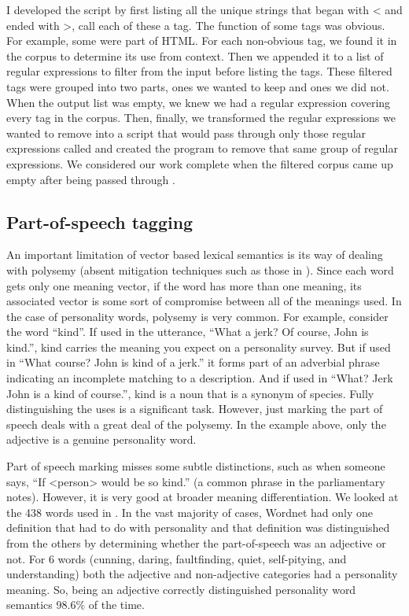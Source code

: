 \documentclass[eric_thesis.tex]{subfiles}
\begin{document}
I developed the script by first listing all the unique strings that began with 
< and ended with >, call each of these a tag. The function of some tags was 
obvious. For example, some were part of HTML. For each non-obvious tag, we found 
it in the corpus to determine its use from context. Then we appended it to a 
list of regular expressions to filter from the input before listing the tags. 
These filtered tags were grouped into two parts, ones we wanted to keep and ones 
we did not. When the output list was empty, we knew we had a regular expression 
covering every tag in the corpus. Then, finally, we transformed the regular 
expressions we wanted to remove into a script that would pass through only those 
regular expressions called  and created the 
 program to remove that same group of regular 
expressions. We considered our work complete when the filtered corpus came up 
empty after being passed through .

\subsection{Part-of-speech tagging}

An important limitation of vector based lexical semantics is its way of dealing 
with polysemy (absent mitigation techniques such as those in ). Since each word gets only one meaning vector, if the 
word has more than one meaning, its associated vector is some sort of compromise 
between all of the meanings used. In the case of personality words, polysemy is 
very common. For example, consider the word ``kind''. If used in the utterance, 
``What a jerk? Of course, John is kind.'', kind carries the meaning you expect 
on a personality survey. But if used in ``What course? John is kind of a jerk.'' 
it forms part of an adverbial phrase indicating an incomplete matching to a 
description. And if used in ``What? Jerk John is a kind of course.'', kind is a 
noun that is a synonym of species. Fully distinguishing the uses is a 
significant task. However, just marking the part of speech deals with a great 
deal of the polysemy. In the example above, only the adjective is a genuine 
personality word. 

Part of speech marking misses some subtle distinctions, such as when someone 
says, ``If <person> would be so kind.'' (a common phrase in the parliamentary 
notes). However, it is very good at broader meaning differentiation. We looked 
at the 438 words used in . In 
the vast majority of cases, Wordnet had only one definition that had to do with 
personality and that definition was distinguished from the others by determining 
whether the part-of-speech was an adjective or not. For 6 words (cunning, 
daring, faultfinding, quiet, self-pitying, and understanding) both the adjective 
and non-adjective categories had a personality meaning. So, being an adjective 
correctly distinguished personality word semantics 98.6\% of the time.
\end{document}
